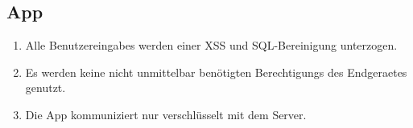 \subsection*{App}

\begin{samepage}
    \begin{enumerate}[label=\textbf{/NFS\arabic*0/}, align=left]
        \item Alle \Glspl{Benutzereingabe} werden einer \Gls{XSS} und \Gls{SQL}-Bereinigung unterzogen.
        \item Es werden keine nicht unmittelbar benötigten \Glspl{Berechtigung} des \Gls{Endgeraet}es genutzt.
        \item Die App kommuniziert nur verschlüsselt mit dem \Gls{Server}.
    \end{enumerate}
\end{samepage}